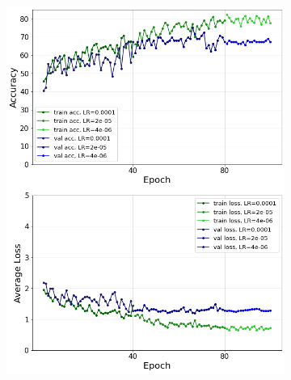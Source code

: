 \documentclass[10pt,twocolumn,hidelinks,letterpaper]{article}
\begin{document}
\begin{figure}
  \centering
  \captionsetup[subfigure]{justification=centering}
  \begin{subfigure}{.325\linewidth}
  	\includegraphics[width=\linewidth]{images/grid_comparison/acc75no_reg.png}
  \end{subfigure}
  \begin{subfigure}{.325\linewidth}

\end{subfigure}
\end{figure}
\end{document}
